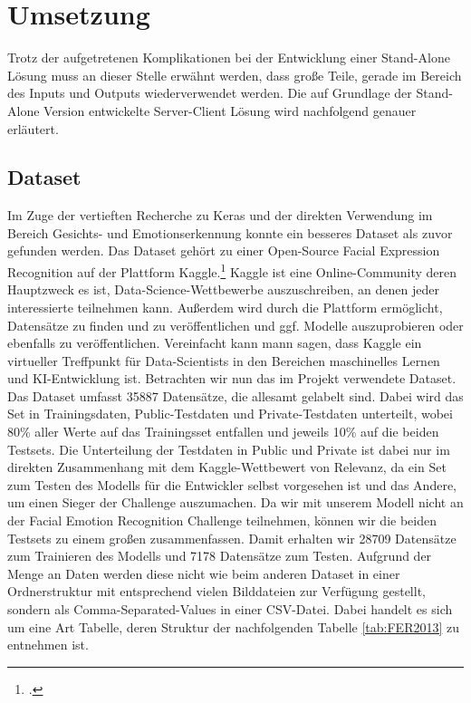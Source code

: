 \documentclass[12pt, a4paper]{report}
\begin{document}
\section{Umsetzung}
Trotz der aufgetretenen Komplikationen bei der Entwicklung einer Stand-Alone Lösung muss an dieser Stelle erwähnt werden, dass große Teile, gerade im Bereich des Inputs und Outputs wiederverwendet werden. Die auf Grundlage der Stand-Alone Version entwickelte Server-Client Lösung wird nachfolgend genauer erläutert.

\subsection{Dataset}
Im Zuge der vertieften Recherche zu Keras und der direkten Verwendung im Bereich Gesichts- und Emotionserkennung konnte ein besseres Dataset als zuvor gefunden werden. Das Dataset gehört zu einer Open-Source Facial Expression Recognition auf der Plattform Kaggle.\footcite[Vgl.][]{FER-Challenge} Kaggle ist eine Online-Community deren Hauptzweck es ist, Data-Science-Wettbewerbe auszuschreiben, an denen jeder interessierte teilnehmen kann. Außerdem wird durch die Plattform ermöglicht, Datensätze zu finden und zu veröffentlichen und ggf. Modelle auszuprobieren oder ebenfalls zu veröffentlichen. Vereinfacht kann mann sagen, dass Kaggle ein virtueller Treffpunkt für Data-Scientists in den Bereichen maschinelles Lernen und KI-Entwicklung ist.\newline
Betrachten wir nun das im Projekt verwendete Dataset. Das Dataset umfasst 35887 Datensätze, die allesamt gelabelt sind. Dabei wird das Set in Trainingsdaten, Public-Testdaten und Private-Testdaten unterteilt, wobei 80\% aller Werte auf das Trainingsset entfallen und jeweils 10\% auf die beiden Testsets. Die Unterteilung der Testdaten in Public und Private ist dabei nur im direkten Zusammenhang mit dem Kaggle-Wettbewert von Relevanz, da ein Set zum Testen des Modells für die Entwickler selbst vorgesehen ist und das Andere, um einen Sieger der Challenge auszumachen. Da wir mit unserem Modell nicht an der Facial Emotion Recognition Challenge teilnehmen, können wir die beiden Testsets zu einem großen zusammenfassen. Damit erhalten wir 28709 Datensätze zum Trainieren des Modells und 7178 Datensätze zum Testen. Aufgrund der Menge an Daten werden diese nicht wie beim anderen Dataset in einer Ordnerstruktur mit entsprechend vielen Bilddateien zur Verfügung gestellt, sondern als Comma-Separated-Values in einer CSV-Datei. Dabei handelt es sich um eine Art Tabelle, deren Struktur der nachfolgenden Tabelle \ref{tab:FER2013} zu entnehmen ist.
\end{document}
